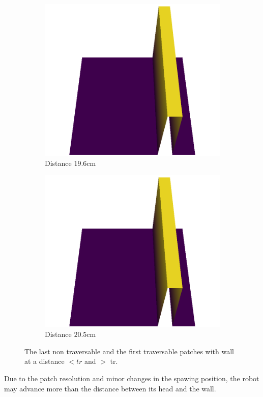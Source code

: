 \documentclass[../document.tex]{subfiles}
\begin{document}
\begin{figure}[H]
\begin{subfigure}[b]{0.33\textwidth}
    \end{subfigure}   \\
    \begin{subfigure}[b]{0.33\textwidth}
        \includegraphics[width=\linewidth]{../img/5/custom_patches/walls_front/1-3d.png}
        \caption{Distance  $19.6$cm}
    \end{subfigure}   
    \begin{subfigure}[b]{0.33\textwidth}
        \includegraphics[width=\linewidth]{../img/5/custom_patches/walls_front/1-3d.png}
        \caption{Distance $20.5$cm}
    \end{subfigure}   
    \caption{The last non traversable and the first traversable patches with wall at a distance $ < tr$ and $ > $ tr.}
\end{figure}
Due to the patch resolution and minor changes in the spawing position, the robot may advance more than the distance between its head and the wall. 
\end{document}
